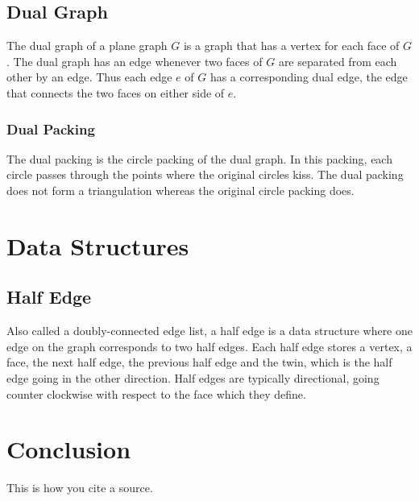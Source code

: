 \documentclass{article}
\begin{document}
\subsection{Dual Graph}
The dual graph of a plane graph $G$ is a graph that has a vertex for each face of $G$. The dual graph has an edge whenever two faces of $G$ are separated from each other by an edge. Thus each edge $e$ of $G$ has a corresponding dual edge, the edge that connects the two faces on either side of $e$. 
\subsubsection{Dual Packing}
The dual packing is the circle packing of the dual graph. In this packing, each circle passes through the points where the original circles kiss. The dual packing does not form a triangulation whereas the original circle packing does.
\section{Data Structures}
\subsection{Half Edge}
Also called a doubly-connected edge list, a half edge is a data structure where one edge on the graph corresponds to two half edges. Each half edge stores a vertex, a face, the next half edge, the previous half edge and the twin, which is the half edge going in the other direction. Half edges are typically directional, going counter clockwise with respect to the face which they define.
\section{Conclusion}
This is how you cite a source.
\citep{adams1995hitchhiker}



\end{document}
